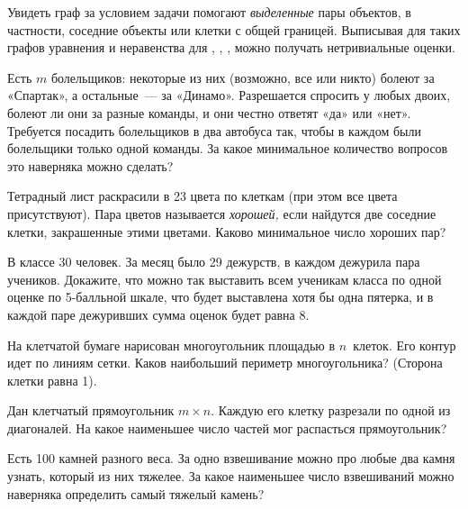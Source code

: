 Увидеть граф за условием задачи помогают \emph{выделенные} пары объектов,
в частности, соседние объекты или клетки с общей границей.
Выписывая для таких графов уравнения и неравенства для
, , , можно получать нетривиальные оценки.

\begin{problems}

\item
Есть $m$ болельщиков: некоторые из них (возможно, все или никто) болеют за
«Спартак», а остальные~— за «Динамо».
Разрешается спросить у любых двоих, болеют ли они за разные команды, и они
честно ответят «да» или «нет».
Требуется посадить болельщиков в два автобуса так, чтобы в каждом были
болельщики только одной команды.
За какое минимальное количество вопросов это наверняка можно сделать?

\item
Тетрадный лист раскрасили в 23 цвета по клеткам (при этом все цвета
присутствуют).
Пара цветов называется \emph{хорошей,} если найдутся две соседние клетки,
закрашенные этими цветами.
Каково минимальное число хороших пар?

\item
В классе 30 человек.
За месяц было 29 дежурств, в каждом дежурила пара учеников.
Докажите, что можно так выставить всем ученикам класса по одной оценке
по 5-балльной шкале, что будет выставлена хотя бы одна пятерка, и в каждой паре
дежуривших сумма оценок будет равна 8.

\item
На клетчатой бумаге нарисован многоугольник площадью в $n$~клеток.
Его контур идет по линиям сетки.
Каков наибольший периметр многоугольника?
(Сторона клетки равна 1).

\item
Дан клетчатый прямоугольник $m \times n$.
Каждую его клетку разрезали по одной из диагоналей.
На какое наименьшее число частей мог распасться прямоугольник?

\item
Есть 100 камней разного веса.
За одно взвешивание можно про любые два камня узнать, который из них тяжелее.
За какое наименьшее число взвешиваний можно наверняка определить самый тяжелый
камень?

\end{problems}

